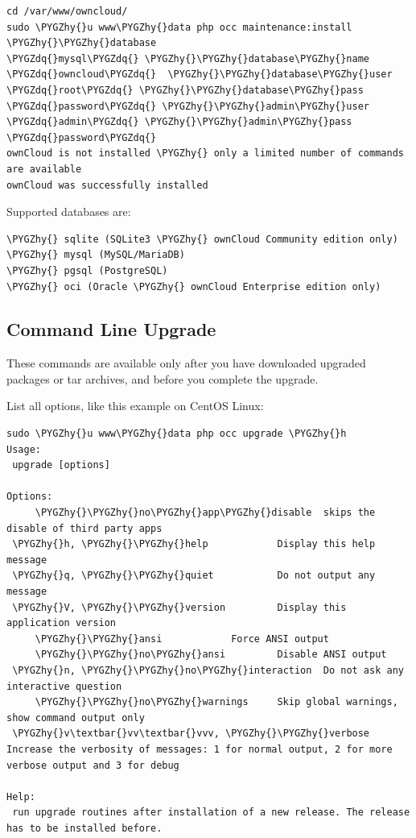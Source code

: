 \documentclass[letterpaper,10pt,english]{sphinxmanual}
\def\PYGZhy{\char`\-}
\def\PYGZdq{\char`\"}
\begin{document}
\begin{Verbatim}[commandchars=\\\{\}]
cd /var/www/owncloud/
sudo \PYGZhy{}u www\PYGZhy{}data php occ maintenance:install \PYGZhy{}\PYGZhy{}database
\PYGZdq{}mysql\PYGZdq{} \PYGZhy{}\PYGZhy{}database\PYGZhy{}name \PYGZdq{}owncloud\PYGZdq{}  \PYGZhy{}\PYGZhy{}database\PYGZhy{}user \PYGZdq{}root\PYGZdq{} \PYGZhy{}\PYGZhy{}database\PYGZhy{}pass
\PYGZdq{}password\PYGZdq{} \PYGZhy{}\PYGZhy{}admin\PYGZhy{}user \PYGZdq{}admin\PYGZdq{} \PYGZhy{}\PYGZhy{}admin\PYGZhy{}pass \PYGZdq{}password\PYGZdq{}
ownCloud is not installed \PYGZhy{} only a limited number of commands are available
ownCloud was successfully installed
\end{Verbatim}

Supported databases are:

\begin{Verbatim}[commandchars=\\\{\}]
\PYGZhy{} sqlite (SQLite3 \PYGZhy{} ownCloud Community edition only)
\PYGZhy{} mysql (MySQL/MariaDB)
\PYGZhy{} pgsql (PostgreSQL)
\PYGZhy{} oci (Oracle \PYGZhy{} ownCloud Enterprise edition only)
\end{Verbatim}


\subsection{Command Line Upgrade}
\label{configuration_server/occ_command:command-line-upgrade-label}\label{configuration_server/occ_command:command-line-upgrade}
These commands are available only after you have downloaded upgraded packages or
tar archives, and before you complete the upgrade.

List all options, like this example on CentOS Linux:

\begin{Verbatim}[commandchars=\\\{\}]
sudo \PYGZhy{}u www\PYGZhy{}data php occ upgrade \PYGZhy{}h
Usage:
 upgrade [options]

Options:
     \PYGZhy{}\PYGZhy{}no\PYGZhy{}app\PYGZhy{}disable  skips the disable of third party apps
 \PYGZhy{}h, \PYGZhy{}\PYGZhy{}help            Display this help message
 \PYGZhy{}q, \PYGZhy{}\PYGZhy{}quiet           Do not output any message
 \PYGZhy{}V, \PYGZhy{}\PYGZhy{}version         Display this application version
     \PYGZhy{}\PYGZhy{}ansi            Force ANSI output
     \PYGZhy{}\PYGZhy{}no\PYGZhy{}ansi         Disable ANSI output
 \PYGZhy{}n, \PYGZhy{}\PYGZhy{}no\PYGZhy{}interaction  Do not ask any interactive question
     \PYGZhy{}\PYGZhy{}no\PYGZhy{}warnings     Skip global warnings, show command output only
 \PYGZhy{}v\textbar{}vv\textbar{}vvv, \PYGZhy{}\PYGZhy{}verbose  Increase the verbosity of messages: 1 for normal output, 2 for more verbose output and 3 for debug

Help:
 run upgrade routines after installation of a new release. The release has to be installed before.
\end{Verbatim}
\end{document}
